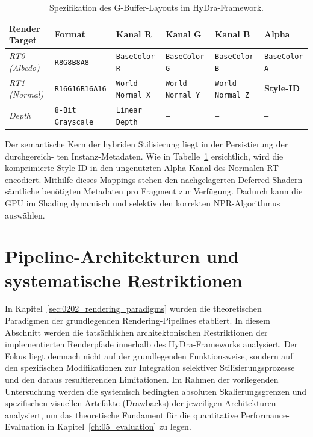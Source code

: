 \begin{table}[htbp]
    \caption{Spezifikation des G-Buffer-Layouts im HyDra-Framework.}
    \label{tab:gbuffer_layout}
    \centering
    \small
    \renewcommand{\arraystretch}{1.3}
    \begin{tabularx}{\textwidth}{l | l X X X X}
        \hline
        \textbf{Render Target} & \textbf{Format} & \textbf{Kanal R} & \textbf{Kanal G} & \textbf{Kanal B} &
        \textbf{Alpha} \\
        \hline
        \textit{RT0 (Albedo)}  & \texttt{R8G8B8A8}        & \texttt{BaseColor R}    & \texttt{BaseColor G}
        & \texttt{BaseColor B}    & \texttt{BaseColor A}    \\

        \hline

        \textit{RT1 (Normal)}  & \texttt{R16G16B16A16}    & \texttt{World Normal X} & \texttt{World Normal Y}
        & \texttt{World Normal Z} & \textbf{Style-ID}       \\

        \hline

        \textit{Depth}         & \texttt{8-Bit Grayscale} & \texttt{Linear Depth}   & \texttt{--}
        & \texttt{--}             & \texttt{--}             \\
        \hline
    \end{tabularx}
\end{table}

Der semantische Kern der hybriden Stilisierung liegt in der Persistierung der durchgereich-
ten Instanz-Metadaten.
Wie in Tabelle~\ref{tab:gbuffer_layout} ersichtlich, wird die komprimierte Style-ID in den
ungenutzten Alpha-Kanal des Normalen-\ac{RT} encodiert.
Mithilfe dieses Mappings stehen den nachgelagerten Deferred-Shadern sämtliche benötigten Metadaten pro Fragment zur
Verfügung.
Dadurch kann die \ac{GPU} im Shading dynamisch und selektiv den korrekten \ac{NPR}-Algorithmus auswählen.


\section{Pipeline-Architekturen und systematische Restriktionen}
\label{sec:0402_pipelines_and_restrictions}

In Kapitel~\ref{sec:0202_rendering_paradigms} wurden die theoretischen Paradigmen der grundlegenden
Rendering-Pipelines etabliert.
In diesem Abschnitt werden die tatsächlichen architektonischen Restriktionen der implementierten Renderpfade innerhalb
des \ac{HyDra}-Frameworks analysiert.
Der Fokus liegt demnach nicht auf der grundlegenden Funktionsweise, sondern auf den spezifischen Modifikationen zur
Integration selektiver Stilisierungsprozesse und den daraus resultierenden Limitationen.
Im Rahmen der vorliegenden Untersuchung werden die systemisch bedingten absoluten Skalierungsgrenzen und spezifischen
visuellen Artefakte (Drawbacks) der jeweiligen Architekturen analysiert, um das theoretische Fundament für die
quantitative Performance-Evaluation in Kapitel~\ref{ch:05_evaluation} zu legen.

